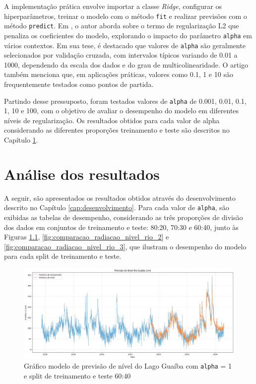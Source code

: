 A implementação prática envolve importar a classe \textit{Ridge}, configurar os hiperparâmetros, treinar o modelo com o método \texttt{fit} e realizar previsões com o método \texttt{predict}. Em \cite{Hastie01102020}, o autor aborda sobre o termo de regularização L2 que penaliza os coeficientes do modelo, explorando o impacto do parâmetro \texttt{alpha} em vários contextos. Em sua tese, é destacado que valores de \texttt{alpha} são geralmente selecionados por validação cruzada, com intervalos típicos variando de 0.01 a 1000, dependendo da escala dos dados e do grau de multicolinearidade. O artigo também menciona que, em aplicações práticas, valores como 0.1, 1 e 10 são frequentemente testados como pontos de partida.

Partindo desse pressuposto, foram testados valores de \texttt{alpha} de 0.001, 0.01, 0.1, 1, 10 e 100, com o objetivo de avaliar o desempenho do modelo em diferentes níveis de regularização.  Os resultados obtidos para cada valor de alpha considerando as diferentes proporções treinamento e teste são descritos no Capítulo \ref{cap:analise_dos_resultados}.

\chapter{Análise dos resultados}
\label{cap:analise_dos_resultados}


A seguir, são apresentados os resultados obtidos através do desenvolvimento descrito no Capítulo \ref{cap:desenvolvimento}. Para cada valor de \texttt{alpha}, são exibidas as tabelas de desempenho, considerando as três proporções de divisão dos dados em conjuntos de treinamento e teste: 80:20, 70:30 e 60:40, junto às Figuras \ref{fig:comparacao_radiacao_nivel_rio}, \ref{fig:comparacao_radiacao_nivel_rio_2} e \ref{fig:comparacao_radiacao_nivel_rio_3}, que ilustram o desempenho do modelo para cada split de treinamento e teste.

\begin{figure}[H]
	\caption{\label{fig:comparacao_radiacao_nivel_rio}Gráfico modelo de previsão de nível do Lago Guaíba com \texttt{alpha} = 1 e split de treinamento e teste 60:40}
	\begin{center}
		\includegraphics[scale=0.35]{figuras/modelo_previsao_60_40.png}
	\end{center}
\end{figure}


